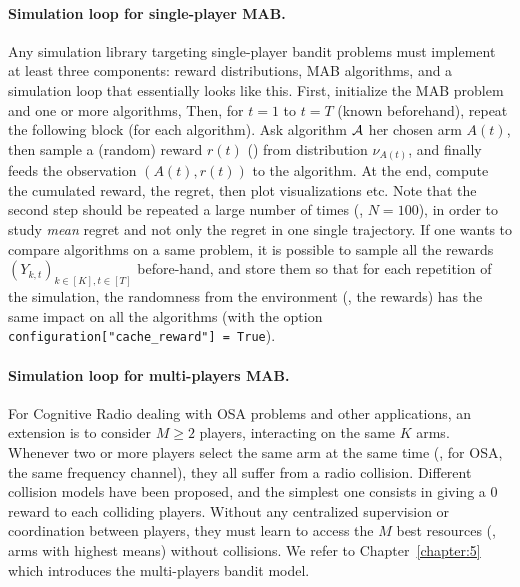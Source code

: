 \paragraph{Simulation loop for single-player MAB.}
%
Any simulation library targeting single-player bandit problems must implement at least three components:
reward distributions, MAB algorithms, and a simulation loop that essentially looks like this.
    First, initialize the MAB problem and one or more algorithms,
    Then, for $t=1$ to $t=T$ (known beforehand), repeat the following block (for each algorithm). Ask algorithm $\mathcal{A}$ her chosen arm $A(t)$, then sample a (random) reward $r(t)$ (\iid) from distribution $\nu_{A(t)}$, and finally feeds the observation $(A(t), r(t))$ to the algorithm.
    At the end, compute the cumulated reward, the regret, then plot visualizations etc.
%
Note that the second step should be repeated a large number of times (\eg, $N=100$), in order to study \emph{mean} regret and not only the regret in one single trajectory.
If one wants to compare algorithms on a same problem, it is possible to sample all the rewards $(Y_{k,t})_{k\in[K], t\in[T]}$ before-hand, and store them so that for each repetition of the simulation, the randomness from the environment (\ie, the rewards) has the same impact on all the algorithms (with the option \texttt{configuration["cache\_reward"] = True}).


\paragraph{Simulation loop for multi-players MAB.}
%
For Cognitive Radio dealing with OSA problems and other applications, an extension is to consider $M\geq2$ players, interacting on the same $K$ arms.
Whenever two or more players select the same arm at the same time (\eg, for OSA, the same frequency channel), they all suffer from a radio collision.
%
Different collision models have been proposed, and the simplest one consists in giving a $0$ reward to each colliding players.
Without any centralized supervision or coordination between players, they must learn to access the $M$ best resources (\ie, arms with highest means) without collisions.
We refer to Chapter~\ref{chapter:5} which introduces the multi-players bandit model.

